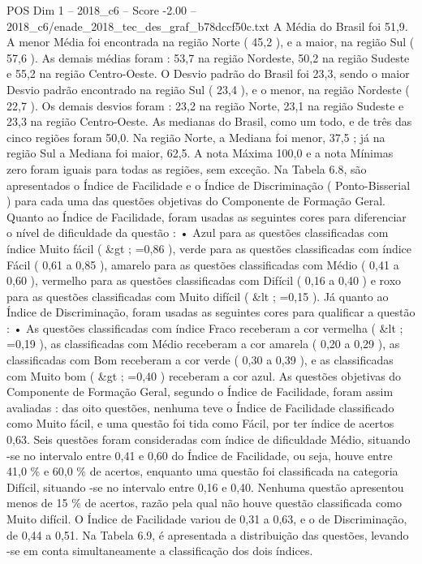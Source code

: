 \begin{textsample}{POS Dim 1 – 2018\_c6 – Score -2.00 – 2018\_c6/enade\_2018\_tec\_des\_graf\_b78dccf50c.txt}
A Média do Brasil foi 51,9.
A menor Média foi encontrada na região Norte ( 45,2 ), e a maior, na região Sul ( 57,6 ).
As demais médias foram : 53,7 na região Nordeste, 50,2 na região Sudeste e 55,2 na região Centro-Oeste.
O Desvio padrão do Brasil foi 23,3, sendo o maior Desvio padrão encontrado na região Sul ( 23,4 ), e o menor, na região Nordeste ( 22,7 ).
Os demais desvios foram : 23,2 na região Norte, 23,1 na região Sudeste e 23,3 na região Centro-Oeste.
As medianas do Brasil, como um todo, e de três das cinco regiões foram 50,0.
Na região Norte, a Mediana foi menor, 37,5 ; já na região Sul a Mediana foi maior, 62,5.
A nota Máxima 100,0 e a nota Mínimas zero foram iguais para todas as regiões, sem exceção.
Na Tabela 6.8, são apresentados o Índice de Facilidade e o Índice de Discriminação ( Ponto-Bisserial ) para cada uma das questões objetivas do Componente de Formação Geral.
Quanto ao Índice de Facilidade, foram usadas as seguintes cores para diferenciar o nível de dificuldade da questão : • Azul para as questões classificadas com índice Muito fácil ( \&gt ; =0,86 ), verde para as questões classificadas com índice Fácil ( 0,61 a 0,85 ), amarelo para as questões classificadas com Médio ( 0,41 a 0,60 ), vermelho para as questões classificadas com Difícil ( 0,16 a 0,40 ) e roxo para as questões classificadas com Muito difícil ( \&lt ; =0,15 ).
Já quanto ao Índice de Discriminação, foram usadas as seguintes cores para qualificar a questão : • As questões classificadas com índice Fraco receberam a cor vermelha ( \&lt ; =0,19 ), as classificadas com Médio receberam a cor amarela ( 0,20 a 0,29 ), as classificadas com Bom receberam a cor verde ( 0,30 a 0,39 ), e as classificadas com Muito bom ( \&gt ; =0,40 ) receberam a cor azul.
As questões objetivas do Componente de Formação Geral, segundo o Índice de Facilidade, foram assim avaliadas : das oito questões, nenhuma teve o Índice de Facilidade classificado como Muito fácil, e uma questão foi tida como Fácil, por ter índice de acertos 0,63.
Seis questões foram consideradas com índice de dificuldade Médio, situando -se no intervalo entre 0,41 e 0,60 do Índice de Facilidade, ou seja, houve entre 41,0 \% e 60,0 \% de acertos, enquanto uma questão foi classificada na categoria Difícil, situando -se no intervalo entre 0,16 e 0,40.
Nenhuma questão apresentou menos de 15 \% de acertos, razão pela qual não houve questão classificada como Muito difícil.
O Índice de Facilidade variou de 0,31 a 0,63, e o de Discriminação, de 0,44 a 0,51.
Na Tabela 6.9, é apresentada a distribuição das questões, levando -se em conta simultaneamente a classificação dos dois índices.

\end{textsample}
